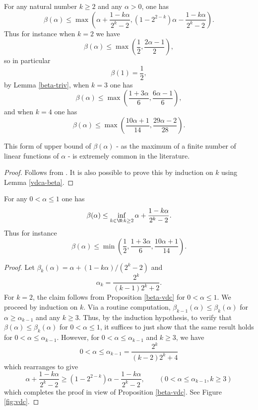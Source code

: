 \begin{proposition}\label{beta-vdc}\leanok For any natural number $k \geq 2$ and any $\alpha>0$, one has
    $$ \beta(\alpha) \leq \max\left( \alpha + \frac{1-k\alpha}{2^k-2}, (1 - 2^{2-k})\alpha - \frac{1-k\alpha}{2^k-2}\right).$$
    Thus for instance when $k=2$ we have
    $$ \beta(\alpha) \leq \max\left( \frac{1}{2}, \frac{2\alpha-1}{2} \right),$$
    so in particular
    \begin{equation}\label{beta-1}
        \beta(1)= \frac{1}{2},
    \end{equation}
        by Lemma \ref{beta-triv},
    when $k=3$ one has
    $$ \beta(\alpha) \leq \max\left( \frac{1+3\alpha}{6}, \frac{6\alpha-1}{6} \right),$$
    and when $k=4$ one has
    $$ \beta(\alpha) \leq \max\left( \frac{10\alpha+1}{14}, \frac{29\alpha-2}{28} \right).$$
\end{proposition}

This form of upper bound of $\beta(\alpha)$ - as the maximum of a finite number of linear functions of $\alpha$ - is extremely common in the literature.

\begin{proof}\leanok Follows from \cite[Theorem 8.20]{ik}. It is also possible to prove this by induction on $k$ using Lemma \ref{vdca-beta}.
\end{proof}

    \begin{corollary}\label{vdc-opt}\leanok  For any $0 < \alpha \leq 1$ one has
    $$\beta(\alpha) \leq \inf_{k \in \N: k \geq 2} \alpha + \frac{1-k\alpha}{2^k-2}.$$
    Thus for instance
    $$ \beta(\alpha) \leq \min\left( \frac{1}{2}, \frac{1+3\alpha}{6}, \frac{10\alpha+1}{14}\right).$$
    \end{corollary}

\begin{proof}\leanok
Let $\beta_k(\alpha) = \alpha + (1 - k\alpha)/(2^k - 2)$ and
\[
\alpha_k = \frac{2^k}{(k - 1)2^k + 2}.
\]
For $k=2$, the claim follows from Proposition \ref{beta-vdc} for $0 < \alpha \leq 1$. We proceed by induction on $k$. Via a routine computation, $\beta_{k-1}(\alpha) \le \beta_k(\alpha)$ for $\alpha \ge \alpha_{k-1}$ and any $k \ge 3$. Thus, by the induction hypothesis, to verify that $\beta(\alpha) \le \beta_k(\alpha)$ for $0 < \alpha \leq 1$, it suffices to just show that the same result holds for $0 < \alpha \le \alpha_{k-1}$. However, for $0 < \alpha \le \alpha_{k-1}$ and $k \ge 3$, we have
\[
0 < \alpha \le \alpha_{k-1} = \frac{2^k}{(k - 2)2^k + 4}
\]
which rearranges to give
\[
\alpha + \frac{1-k\alpha}{2^k-2}\geq (1 - 2^{2-k})\alpha - \frac{1-k\alpha}{2^k-2},\qquad (0 < \alpha \le \alpha_{k-1}, k \ge 3)
\]
which completes the proof in view of Proposition \ref{beta-vdc}.  See Figure \ref{fig:vdc}.
\end{proof}


